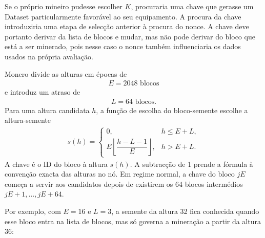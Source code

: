 Se o próprio mineiro pudesse escolher \(K\), procuraria uma chave que gerasse
um Dataset particularmente favorável ao seu equipamento. A procura da chave
introduziria uma etapa de selecção anterior à procura do nonce. A chave deve
portanto derivar da lista de blocos e mudar, mas não pode derivar do bloco que está a
ser minerado, pois nesse caso o nonce também influenciaria os dados usados na
própria avaliação.

Monero divide as alturas em épocas de
\begin{align*}
 E=2048\text{ blocos}
\end{align*}
e introduz um atraso de
\begin{align*}
 L=64\text{ blocos}.
\end{align*}
Para uma altura candidata \(h\), a função de escolha do bloco-semente
escolhe a altura-semente
\begin{align}
 s(h)=
 \begin{cases}
  0,&h\leq E+L,\\[2mm]
  E\left\lfloor\dfrac{h-L-1}{E}\right\rfloor,&h>E+L.
 \end{cases}
 \label{eq:randomx-seed-height}
\end{align}
A chave é o ID do bloco à altura \(s(h)\). A subtracção de 1 prende a fórmula à
convenção exacta das alturas no nó. Em regime normal, a chave do bloco
\(jE\) começa a servir aos candidatos depois de existirem os 64 blocos
intermédios \(jE+1,\ldots,jE+64\).

Por exemplo, com \(E=16\) e \(L=3\), a semente da
altura 32 fica conhecida quando esse bloco entra na lista de blocos, mas só governa a
mineração a partir da altura 36:

\begin{center}
\end{center}

